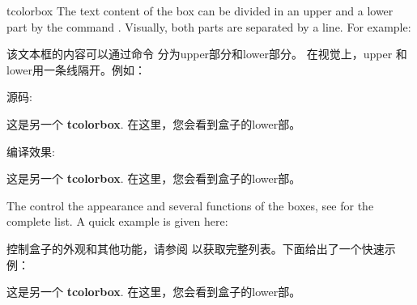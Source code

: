 \begin{docEnvironment}{tcolorbox}{}
The text content of the box can be divided
in an upper and a lower part
by the command . Visually, both parts are separated by a line.
For example:

该文本框的内容可以通过命令  分为upper部分和lower部分。 在视觉上，upper 和 lower用一条线隔开。例如：





\begin{tcolorbox}[title={upper 和 lower用一条线隔开}, before skip=\baselineskip,after skip=\baselineskip,sidebyside]
源码:  
\begin{dispListing}
\begin{tcolorbox}
这是另一个 \textbf{tcolorbox}.
\tcblower
在这里，您会看到盒子的lower部。
\end{tcolorbox}  
\end{dispListing}
\tcblower
编译效果:
\begin{tcolorbox}
这是另一个 \textbf{tcolorbox}.
\tcblower
在这里，您会看到盒子的lower部。
\end{tcolorbox}    
\end{tcolorbox}

The  control the appearance and several functions of the boxes,
see  for the complete list.
A quick example is given here:

{}控制盒子的外观和其他功能，请参阅  以获取完整列表。下面给出了一个快速示例：

\begin{dispExample}
\begin{tcolorbox}[colback=red!5!white,colframe=red!75!black,title=My nice heading]
  这是另一个 \textbf{tcolorbox}.
\tcblower
在这里，您会看到盒子的lower部。
\end{tcolorbox}
\end{dispExample}
\end{docEnvironment}